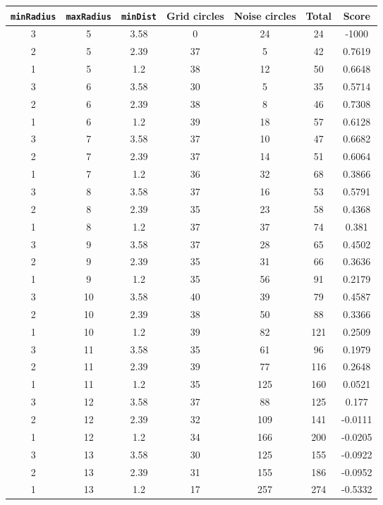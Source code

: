 \documentclass[letterpaper, 12pt]{article}
\begin{document}
\begin{longtable}{|c|c|c|c|c|c|c|}
\hline
\textbf{\texttt{minRadius}} & \textbf{\texttt{maxRadius}} & \textbf{\texttt{minDist}} & \textbf{Grid circles} & \textbf{Noise circles} & \textbf{Total} & \textbf{Score} \\
\hline
3 & 5 & 3.58 & 0 & 24 & 24 & -1000 \\
\hline
2 & 5 & 2.39 & 37 & 5 & 42 & 0.7619 \\
\hline
1 & 5 & 1.2 & 38 & 12 & 50 & 0.6648 \\
\hline
3 & 6 & 3.58 & 30 & 5 & 35 & 0.5714 \\
\hline
2 & 6 & 2.39 & 38 & 8 & 46 & 0.7308 \\
\hline
1 & 6 & 1.2 & 39 & 18 & 57 & 0.6128 \\
\hline
3 & 7 & 3.58 & 37 & 10 & 47 & 0.6682 \\
\hline
2 & 7 & 2.39 & 37 & 14 & 51 & 0.6064 \\
\hline
1 & 7 & 1.2 & 36 & 32 & 68 & 0.3866 \\
\hline
3 & 8 & 3.58 & 37 & 16 & 53 & 0.5791 \\
\hline
2 & 8 & 2.39 & 35 & 23 & 58 & 0.4368 \\
\hline
1 & 8 & 1.2 & 37 & 37 & 74 & 0.381 \\
\hline
3 & 9 & 3.58 & 37 & 28 & 65 & 0.4502 \\
\hline
2 & 9 & 2.39 & 35 & 31 & 66 & 0.3636 \\
\hline
1 & 9 & 1.2 & 35 & 56 & 91 & 0.2179 \\
\hline
3 & 10 & 3.58 & 40 & 39 & 79 & 0.4587 \\
\hline
2 & 10 & 2.39 & 38 & 50 & 88 & 0.3366 \\
\hline
1 & 10 & 1.2 & 39 & 82 & 121 & 0.2509 \\
\hline
3 & 11 & 3.58 & 35 & 61 & 96 & 0.1979 \\
\hline
2 & 11 & 2.39 & 39 & 77 & 116 & 0.2648 \\
\hline
1 & 11 & 1.2 & 35 & 125 & 160 & 0.0521 \\
\hline
3 & 12 & 3.58 & 37 & 88 & 125 & 0.177 \\
\hline
2 & 12 & 2.39 & 32 & 109 & 141 & -0.0111 \\
\hline
1 & 12 & 1.2 & 34 & 166 & 200 & -0.0205 \\
\hline
3 & 13 & 3.58 & 30 & 125 & 155 & -0.0922 \\
\hline
2 & 13 & 2.39 & 31 & 155 & 186 & -0.0952 \\
\hline
1 & 13 & 1.2 & 17 & 257 & 274 & -0.5332 \\

\end{longtable}
\end{document}
